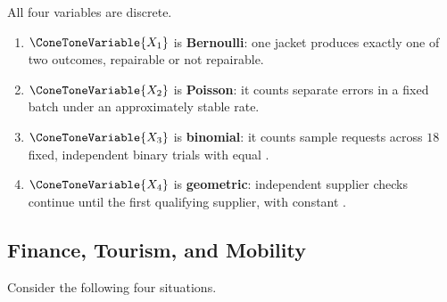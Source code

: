 	All four variables are discrete.
	\begin{enumerate}
		\item $\ConeToneVariable{X_1}$ is \textbf{Bernoulli}: one jacket produces exactly one of two outcomes, repairable or not repairable.
		\item $\ConeToneVariable{X_2}$ is \textbf{Poisson}: it counts separate errors in a fixed batch under an approximately stable rate.
		\item $\ConeToneVariable{X_3}$ is \textbf{binomial}: it counts sample requests across $18$ fixed, independent binary trials with equal  .
		\item $\ConeToneVariable{X_4}$ is \textbf{geometric}: independent supplier checks continue until the first qualifying supplier, with constant  .
	\end{enumerate}


	\subsection{Finance, Tourism, and Mobility}
	\label{sec:finance-tourism-mobility}

	Consider the following four situations.

